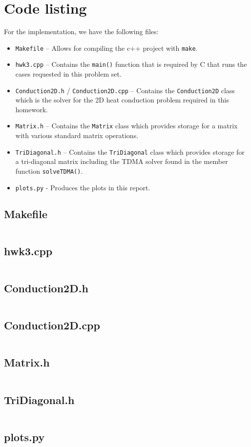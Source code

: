\documentclass{article}
\begin{document}
\section*{Code listing}

For the implementation, we have the following files:
\begin{itemize}
	\item \texttt{Makefile} -- Allows for compiling the c++ project with \texttt{make}.
	\item \texttt{hwk3.cpp} -- Contains the \texttt{main()} function that is required by C that runs the cases requested in this problem set.
	\item \texttt{Conduction2D.h} / \texttt{Conduction2D.cpp} -- Contains the \texttt{Conduction2D} class which is the solver for the 2D heat conduction problem required in this homework.
	\item \texttt{Matrix.h} -- Contains the \texttt{Matrix} class which provides storage for a matrix with various standard matrix operations.
	\item \texttt{TriDiagonal.h} -- Contains the \texttt{TriDiagonal} class which provides storage for a tri-diagonal matrix including the TDMA solver found in the member function \texttt{solveTDMA()}.
	\item \texttt{plots.py} - Produces the plots in this report.
\end{itemize}

\subsection*{Makefile}
\inputminted[fontsize=\small]{Makefile}{../Makefile}

\subsection*{hwk3.cpp}
\inputminted[fontsize=\small]{c++}{../hwk3.cpp}

\subsection*{Conduction2D.h}
\inputminted[fontsize=\small]{c++}{../Conduction2D.h}

\subsection*{Conduction2D.cpp}
\inputminted[fontsize=\small]{c++}{../Conduction2D.cpp}

\subsection*{Matrix.h}
\inputminted[fontsize=\small]{c++}{../Matrix.h}

\subsection*{TriDiagonal.h}
\inputminted[fontsize=\small]{c++}{../TriDiagonal.h}

\subsection*{plots.py}
\inputminted[fontsize=\small]{python}{../plots.py}
\end{document}
